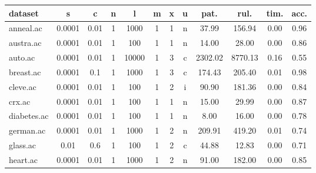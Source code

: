\begin{table}[htbp]
	\centering
		\begin{tabular}{|l|c|c|c|c|c|c|c||c|c|c|c|}
		\hline
		\textbf{dataset}	& \textbf{s}	& \textbf{c}	& \textbf{n}	& \textbf{l}	& \textbf{m}	& \textbf{x}	& \textbf{u}	& \textbf{pat.}	& \textbf{rul.}	& \textbf{tim.}	& \textbf{acc.}	\\
		\hline
		anneal.ac      & 0.0001   & 0.01        & 1              & 1000                & 1             & 1      & n             & 37.99          & 156.94         & 0.00           & 0.96           \\
		\hline
		austra.ac      & 0.0001   & 0.01        & 1              & 100                 & 1             & 1      & n             & 14.00          & 28.00          & 0.00           & 0.86           \\
		\hline
		auto.ac        & 0.0001   & 0.01        & 1              & 10000               & 1             & 3      & c             & 2302.02        & 8770.13        & 0.16           & 0.55           \\
		\hline
		breast.ac      & 0.0001   & 0.1         & 1              & 1000                & 1             & 3      & c             & 174.43         & 205.40         & 0.01           & 0.98           \\
		\hline
		cleve.ac       & 0.0001   & 0.01        & 1              & 100                 & 1             & 2      & i             & 90.90          & 181.36         & 0.00           & 0.84           \\
		\hline
		crx.ac         & 0.0001   & 0.01        & 1              & 100                 & 1             & 1      & n             & 15.00          & 29.99          & 0.00           & 0.87           \\
		\hline
		diabetes.ac    & 0.0001   & 0.01        & 1              & 100                 & 1             & 1      & n             & 8.00           & 16.00          & 0.00           & 0.78           \\
		\hline
		german.ac      & 0.0001   & 0.01        & 1              & 1000                & 1             & 2      & n             & 209.91         & 419.20         & 0.01           & 0.74           \\
		\hline
		glass.ac       & 0.01     & 0.6         & 1              & 100                 & 1             & 2      & c             & 44.88          & 12.83          & 0.00           & 0.71           \\
		\hline
		heart.ac       & 0.0001   & 0.01        & 1              & 1000                & 1             & 2      & n             & 91.00          & 182.00         & 0.00           & 0.85           \\

\end{tabular}
\end{table}
